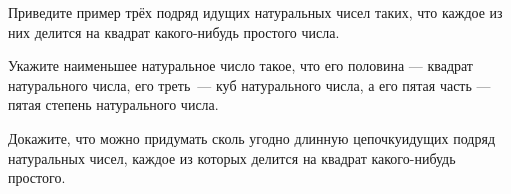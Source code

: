﻿
\begin{itemize}

\itA Приведите пример трёх подряд идущих натуральных чисел таких, что каждое из них делится на квадрат какого-нибудь простого числа.

\itB Укажите наименьшее натуральное число такое, что его половина — квадрат натурального числа, его треть~— куб натурального числа, а его пятая часть — пятая степень натурального числа.

\itC Докажите, что можно придумать сколь угодно длинную цепочку\linebreak идущих подряд натуральных чисел, каждое из которых делится на квадрат какого-нибудь простого.
\end{itemize}